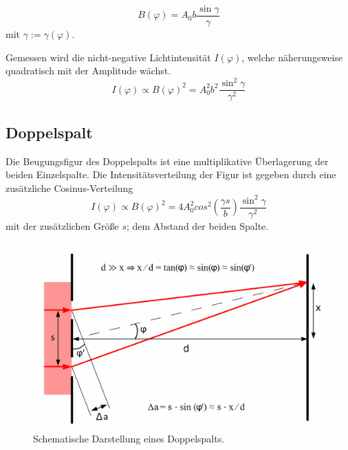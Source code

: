 \begin{equation}
  B(\varphi) = A_0b\frac{\sin{\gamma}}{\gamma}
\end{equation}
mit $\gamma := \gamma(\varphi)$.

Gemessen wird die nicht-negative Lichtintensität $I(\varphi)$, welche näherungsweise quadratisch mit der Amplitude wächst.
\begin{equation}
  I(\varphi) \propto B(\varphi)^2 = A_0^2b^2\frac{\sin^2{\gamma}}{\gamma^2}
  \label{eqn:I}
\end{equation}

\subsection{Doppelspalt}
Die Beugungsfigur des Doppelspalts ist eine multiplikative Überlagerung der beiden Einzelspalte.
Die Intensitätsverteilung der Figur ist gegeben durch eine zusätzliche Cosinus-Verteilung\cite{Versuchsanleitung}
\begin{equation}
  I(\varphi) \propto B(\varphi)^2 = 4A_0^2cos^2{(\frac{\gamma s}{b})}\frac{\sin^2{\gamma}}{\gamma^2}
  \label{eqn:doppelspalt}
\end{equation}
mit der zusätzlichen Größe $s$; dem Abstand der beiden Spalte.

\begin{figure}
  \centering
  \includegraphics[width=.9\textwidth]{plots/Doppelspalt.png}
  \caption{Schematische Darstellung eines Doppelspalts.\cite{DoppelspaltWiki}}
  \label{fig:schemDoppel}
\end{figure}

